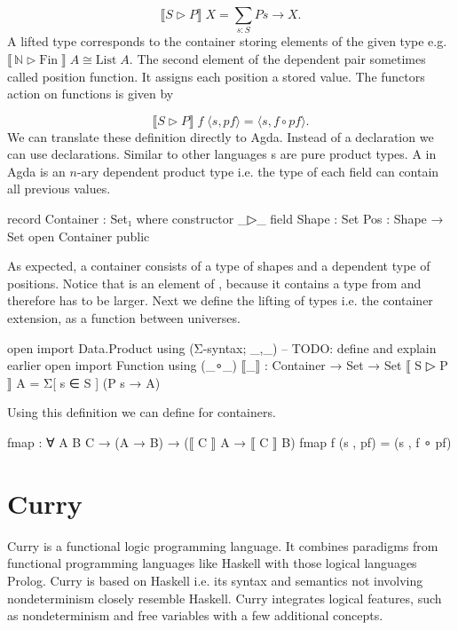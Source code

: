 \documentclass[10pt,a4paper,twoside]{report}
\begin{document}
$$
  \lBrack S \rhd P \rBrack\;X = \sum\limits_{s : S} P s \rightarrow X.
$$
A lifted type corresponds to the container storing elements of the given type
e.g. $\lBrack\, \mathbb{N} \rhd \mathrm{Fin}\;\rBrack \; A \cong
\mathrm{List}\;A$.
The second element of the dependent pair sometimes called position function.
It assigns each position a stored value.
The functors action on functions is given by

$$
  \lBrack S \rhd P \rBrack \;f\;\langle s , pf \rangle = \langle s , f \circ pf \rangle.
$$
We can translate these definition directly to Agda.
Instead of a  declaration we can use 
declarations.
Similar to other languages s are pure product types.
A  in Agda is an $n$-ary dependent product type i.e. the
type of each field can contain all previous values.

\begin{code}
record Container : Set₁ where
  constructor _▷_
  field
    Shape : Set
    Pos : Shape → Set
open Container public
\end{code}
As expected, a container consists of a type of shapes and a dependent type of
positions.
Notice that  is an element of ,
because it contains a type from  and therefore has to be
larger.
Next we define the lifting of types i.e. the container extension, as a function
between universes.

\begin{code}
open import Data.Product using (Σ-syntax; _,_) -- TODO: define and explain earlier
open import Function using (_∘_)
⟦_⟧ : Container → Set → Set
⟦ S ▷ P ⟧ A = Σ[ s ∈ S ] (P s → A)
\end{code}
Using this definition we can define  for containers.

\begin{code}
fmap : ∀ {A B C} → (A → B) → (⟦ C ⟧ A → ⟦ C ⟧ B)
fmap f (s , pf) = (s , f ∘ pf)
\end{code}

\section{Curry}

Curry \cite{Hanus95curry} is a functional logic programming language.
It combines paradigms from functional programming languages like Haskell
with those logical languages Prolog.
Curry is based on Haskell i.e. its syntax and semantics not involving
nondeterminism closely resemble Haskell.
Curry integrates logical features, such as nondeterminism and free variables
with a few additional concepts.
\end{document}
